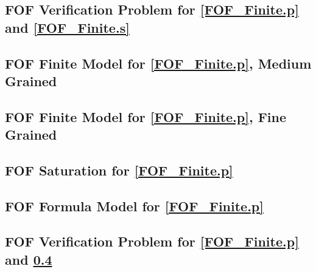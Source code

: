 \documentclass{easychair}
\begin{document}
\newpage
\subsection{FOF Verification Problem for \ref{FOF_Finite.p} and \ref{FOF_Finite.s}}
\label{FOF_Finite.s.p}
\begin{small}

\end{small}

\newpage
\subsection{FOF Finite Model for \ref{FOF_Finite.p}, Medium Grained}
\label{FOF_Finite_Medium.s}
\begin{small}

\end{small}

\newpage
\subsection{FOF Finite Model for \ref{FOF_Finite.p}, Fine Grained}
\label{FOF_Finite_Fine.s}
\begin{small}

\end{small}

\newpage
\subsection{FOF Saturation for \ref{FOF_Finite.p}}
\label{FOF_Saturation.s}
\begin{small}

\end{small}

\newpage
\subsection{FOF Formula Model for \ref{FOF_Finite.p}}
\label{FOF_Formulae.s}
\begin{small}

\end{small}

\newpage
\subsection{FOF Verification Problem for \ref{FOF_Finite.p} and \ref{FOF_Saturation.s}}
\label{FOF_Saturation.s.p}
\begin{small}

\end{small}
\end{document}
